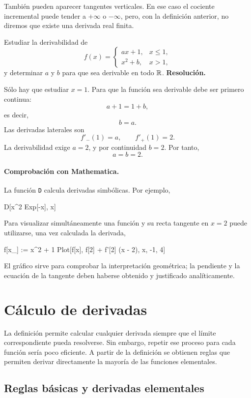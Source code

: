 También pueden aparecer tangentes verticales. En ese caso el cociente incremental puede tender a $+\infty$ o $-\infty$, pero, con la definición anterior, no diremos que existe una derivada real finita.

\begin{solvedexercise}
Estudiar la derivabilidad de
\[
f(x)=
\begin{cases}
ax+1, & x\leq1,\\
x^2+b, & x>1,
\end{cases}
\]
y determinar $a$ y $b$ para que sea derivable en todo $\mathbb{R}$.
\tcblower
\textbf{Resolución.}\par\smallskip
Sólo hay que estudiar $x=1$. Para que la función sea derivable debe ser primero continua:
\[
a+1=1+b,
\]
es decir,
\[
b=a.
\]
Las derivadas laterales son
\[
f'_-(1)=a,
\qquad
f'_+(1)=2.
\]
La derivabilidad exige $a=2$, y por continuidad $b=2$. Por tanto,
\[
\boxed{a=b=2}.
\]
\end{solvedexercise}

\paragraph{Comprobación con Mathematica.}
La función \texttt{D} calcula derivadas simbólicas. Por ejemplo,
\begin{mathematicacode}
D[x^2 Exp[-x], x]
\end{mathematicacode}
Para visualizar simultáneamente una función y su recta tangente en $x=2$ puede utilizarse, una vez calculada la derivada,
\begin{mathematicacode}
f[x_] := x^2 + 1
Plot[{f[x], f[2] + f'[2] (x - 2)}, {x, -1, 4}]
\end{mathematicacode}
El gráfico sirve para comprobar la interpretación geométrica; la pendiente y la ecuación de la tangente deben haberse obtenido y justificado analíticamente.

\section{Cálculo de derivadas}
\label{sec:calculo-derivadas}

La definición permite calcular cualquier derivada siempre que el límite correspondiente pueda resolverse. Sin embargo, repetir ese proceso para cada función sería poco eficiente. A partir de la definición se obtienen reglas que permiten derivar directamente la mayoría de las funciones elementales.

\subsection{Reglas básicas y derivadas elementales}

